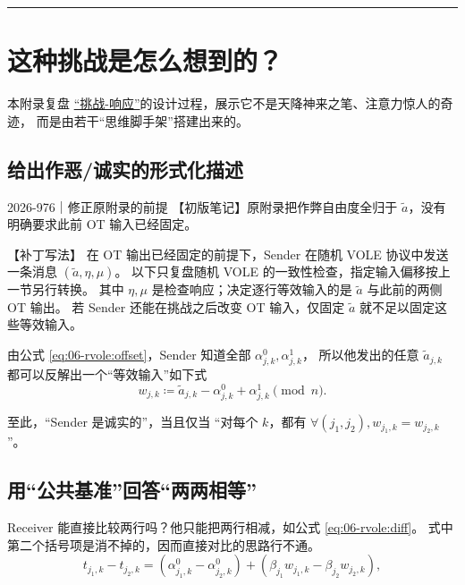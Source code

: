 \begin{center}\rule{0.5\linewidth}{0.5pt}\end{center}

\section{这种挑战是怎么想到的？}

本附录复盘 \hyperref[sec:rvole:challenge-response]{“挑战-响应”}的设计过程，展示它不是天降神来之笔、注意力惊人的奇迹，
而是由若干“思维脚手架”搭建出来的。

\subsection{给出作恶/诚实的形式化描述}

\begin{patchnote}{2026-976｜修正原附录的前提}
  【初版笔记】原附录把作弊自由度全归于 $\tilde a$，没有明确要求此前 OT 输入已经固定。

  【补丁写法】
  在 OT 输出已经固定的前提下，Sender 在随机 VOLE 协议中发送一条消息 $(\tilde a,\eta,\mu)$。
  以下只复盘随机 VOLE 的一致性检查，指定输入偏移按上一节另行转换。
  其中 $\eta,\mu$ 是检查响应；决定逐行等效输入的是 $\tilde a$ 与此前的两侧 OT 输出。
  若 Sender 还能在挑战之后改变 OT 输入，仅固定 $\tilde a$ 就不足以固定这些等效输入。
\end{patchnote}

由公式 \eqref{eq:06-rvole:offset}，Sender 知道全部 $\alpha^0_{j,k}, \alpha^1_{j,k}$，
所以他发出的任意 $\tilde a_{j,k}$ 都可以反解出一个“等效输入”如下式
\begin{equation}\label{eq:06-rvole:16}
  w_{j,k} \coloneq \tilde a_{j,k} - \alpha^0_{j,k} + \alpha^1_{j,k} \pmod n.
\end{equation}

至此，“Sender 是诚实的”，当且仅当
“对每个 $k$，都有 $\forall (j_1, j_2), w_{j_1,k}=w_{j_2,k}$”。

\subsection{用“公共基准”回答“两两相等”}

Receiver 能直接比较两行吗？他只能把两行相减，如公式 \eqref{eq:06-rvole:diff}。
式中第二个括号项是消不掉的，因而直接对比的思路行不通。
\begin{equation}
  \label{eq:06-rvole:diff}
  t_{j_1,k} - t_{j_2,k} = \left(\alpha^0_{j_1,k} - \alpha^0_{j_2,k}\right) + \left(\beta_{j_1} w_{j_1,k} - \beta_{j_2} w_{j_2,k}\right),
\end{equation}


